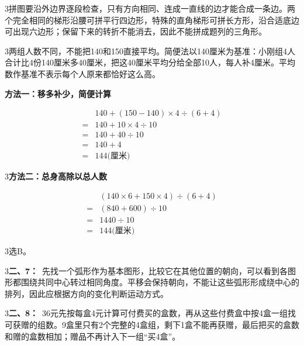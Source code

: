 \documentclass[multi=snippet,border={5bp 20bp 5bp 5bp}]{standalone}
\newenvironment{snippet}[3]{\begin{minipage}{#1bp}\color{answerred}\fontsize{#2}{#3}\selectfont\raggedright}{\end{minipage}}
\begin{document}
\begin{snippet}{505}{11.5}{14}\begin{multicols}{3}\raggedcolumns 拼图要沿外边界逐段检查，只有方向相同、连成一直线的边才能合成一条边。两个完全相同的梯形沿腰可拼平行四边形，特殊的直角梯形可拼长方形，沿合适底边可出现六边形；保留下来的转折不能消去，因此不能拼成题列的三角形。\end{multicols}\end{snippet}
\begin{snippet}{505}{11.5}{14}\begin{multicols}{3}\raggedcolumns 两组人数不同，不能把140和150直接平均。简便法以140厘米为基准：小刚组4人合计比4份140厘米多40厘米，把这40厘米平均分给全部10人，每人补4厘米。平均数作基准不表示每个人原来都恰好这么高。\par \textbf{方法一：移多补少，简便计算}\end{multicols}\[\begin{aligned}&140+(150-140)\times4\div(6+4)\\={}&140+10\times4\div10\\={}&140+40\div10\\={}&140+4\\={}&144\text{(厘米)}\end{aligned}\]\begin{multicols}{3}\raggedcolumns \textbf{方法二：总身高除以总人数}\end{multicols}\[\begin{aligned}&(140\times6+150\times4)\div(6+4)\\={}&(840+600)\div10\\={}&1440\div10\\={}&144\text{(厘米)}\end{aligned}\]\begin{multicols}{3}\raggedcolumns 选B。\end{multicols}\end{snippet}
\begin{snippet}{505}{11.5}{14}\begin{multicols}{3}\raggedcolumns \textbf{二、7：}\ 先找一个弧形作为基本图形，比较它在其他位置的朝向，可以看到各图形都围绕共同中心转过相同角度。平移会保持朝向，不能让这些弧形形成绕中心的排列，因此应根据方向的变化判断运动方式。\end{multicols}\end{snippet}
\begin{snippet}{505}{11.5}{14}\begin{multicols}{3}\raggedcolumns \textbf{二、8：}\ 36元先按每盒4元计算可付费买的盒数，再从这些付费盒中按4盒一组找可获赠的组数。9盒里只有2个完整的4盒组，剩下1盒不能再获赠，最后把买的盒数和赠的盒数相加；赠品不再计入下一组“买4盒”。\end{multicols}\end{snippet}
\end{document}
